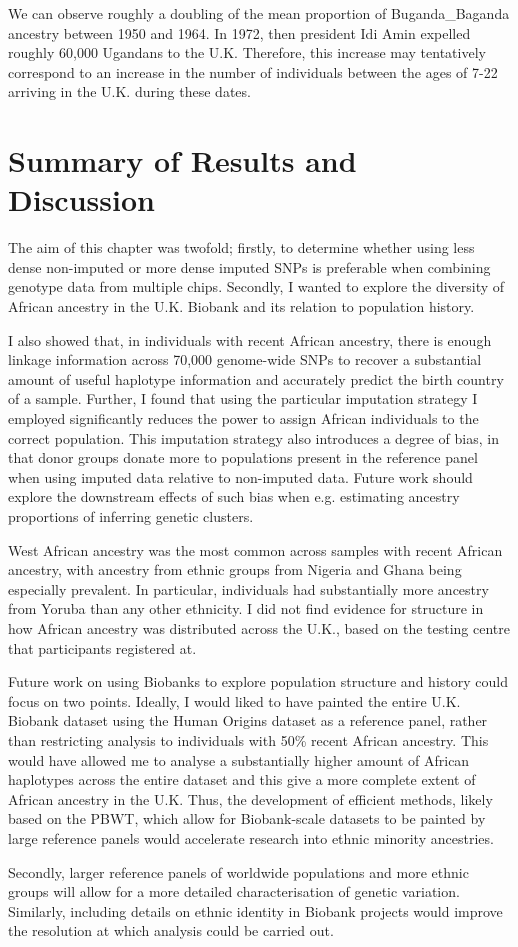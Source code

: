 We can observe roughly a doubling of the mean proportion of  Buganda\_Baganda ancestry between 1950 and 1964. In 1972, then president Idi Amin expelled roughly 60,000 Ugandans to the U.K. Therefore, this increase may tentatively correspond to an increase in the number of individuals between the ages of 7-22 arriving in the U.K. during these dates. 

\section{Summary of Results and Discussion} 

The aim of this chapter was twofold; firstly, to determine whether using less dense non-imputed or more dense imputed SNPs is preferable when combining genotype data from multiple chips. Secondly, I wanted to explore the diversity of African ancestry in the U.K. Biobank and its relation to population history.  

I also showed that, in individuals with recent African ancestry, there is enough linkage information across 70,000 genome-wide SNPs to recover a substantial amount of useful haplotype information and accurately predict the birth country of a sample. Further, I found that using the particular imputation strategy I employed significantly reduces the power to assign African individuals to the correct population. This imputation strategy also introduces a degree of bias, in that donor groups donate more to populations present in the reference panel when using imputed data relative to non-imputed data. Future work should explore the downstream effects of such bias when e.g. estimating ancestry proportions of inferring genetic clusters. 

West African ancestry was the most common across samples with recent African ancestry, with ancestry from ethnic groups from Nigeria and Ghana being especially prevalent. In particular, individuals had substantially more ancestry from Yoruba than any other ethnicity. I did not find evidence for structure in how African ancestry was distributed across the U.K., based on the testing centre that participants registered at. 

Future work on using Biobanks to explore population structure and history could focus on two points.
Ideally, I would liked to have painted the entire U.K. Biobank dataset using the Human Origins dataset as a reference panel, rather than restricting analysis to individuals with 50\% recent African ancestry. This would have allowed me to analyse a substantially higher amount of African haplotypes across the entire dataset and this give a more complete extent of African ancestry in the U.K. Thus, the development of efficient methods, likely based on the PBWT, which allow for Biobank-scale datasets to be painted by large reference panels would accelerate research into ethnic minority ancestries. 

Secondly, larger reference panels of worldwide populations and more ethnic groups will allow for a more detailed characterisation of genetic variation.  Similarly, including details on ethnic identity in Biobank projects would improve the resolution at which analysis could be carried out.  


